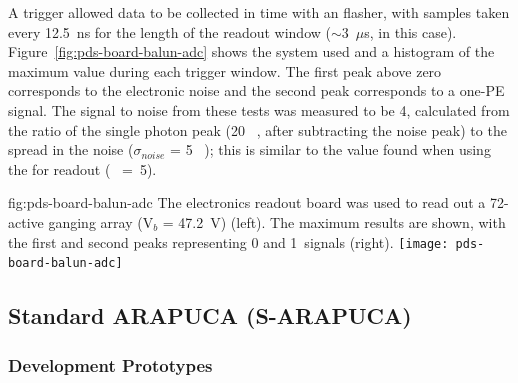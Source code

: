 A trigger allowed data to be collected in time with an  flasher, with samples taken every 12.5~ns for the length of the readout window ($\sim$3~$\mu$s, in this case). Figure~\ref{fig:pds-board-balun-adc} shows the system used and a histogram of the maximum   value during each trigger window. The first peak above zero corresponds to the electronic noise and the second peak corresponds to a one-PE signal. The signal to noise from these tests was measured to be 4, calculated from the ratio of the single photon peak (20~ , after subtracting the noise peak) to the spread in the noise ($\sigma_{noise}$ = 5~ ); this is similar to the value found when using the  for readout ( ~=~5).

\begin{dunefigure}
{fig:pds-board-balun-adc}
{The  electronics readout board was used to read out a 72- active ganging array (V$_b$ = \SI{47.2}{V}) (left). The maximum  results are shown, with the first and second peaks representing 0 and 1~\phel signals (right).}
\texttt{[image: pds-board-balun-adc]} 
\vspace{-7.0cm}
\end{dunefigure}


\subsection{Standard ARAPUCA (S-ARAPUCA)}
\label{sec:sarapuca-prototypes}


\subsubsection{Development Prototypes}
\label{sec:valid-initial}

